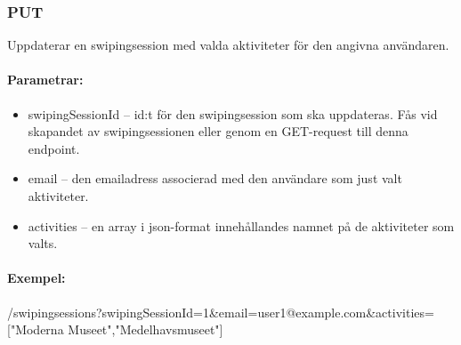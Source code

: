 \documentclass{article}
\begin{document}
\subsubsection*{PUT}

Uppdaterar en swipingsession med valda aktiviteter för den angivna användaren.

\paragraph{Parametrar:}

\begin{itemize}

	\item swipingSessionId -- id:t för den swipingsession som ska uppdateras. Fås vid skapandet av swipingsessionen eller genom en
		GET-request till denna endpoint.
	\item email -- den emailadress associerad med den användare som just valt aktiviteter.
	\item activities -- en array i json-format innehållandes namnet på de aktiviteter som valts.

\end{itemize}

\paragraph{Exempel:} /swipingsessions?swipingSessionId=1\&email=user1@example.com\&activities=["Moderna Museet","Medelhavsmuseet"]
\end{document}
